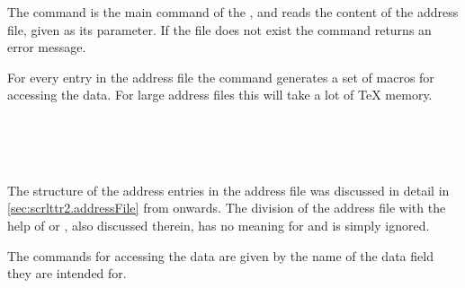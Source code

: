 \begin{Declaration}
\end{Declaration}%
%
%
The command  is the main command of the
, and reads the content of the address
file, given as its parameter.  If the file does not
exist the command returns an error message.

For every entry in the address file the command generates a set of
macros for accessing the data. For large address files this will take
a lot of {\TeX} memory. 

\begin{Declaration}%
  \\
  \\
  \\
\end{Declaration}%
%
%
%
%

The structure of the address entries in the address file was discussed
in detail in \autoref{sec:scrlttr2.addressFile} from
 onwards.  The division of
the address file with the help of  or ,
also discussed therein, has no meaning for  and is
simply ignored.

The commands for accessing the data are given by the name of the data
field they are intended for.
\begin{Declaration}
\\
\\
\\
\\
\\
\\
\\
\\
\\
\end{Declaration}%
%
%
%
%
%

